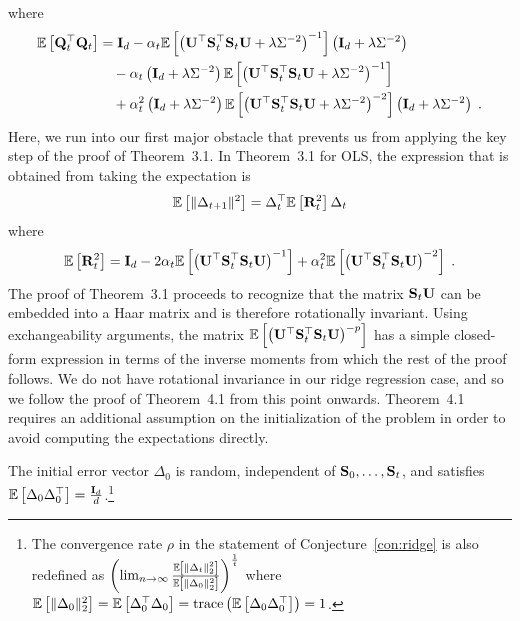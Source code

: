 where
\begin{align*}
\mathbb{E}\left[\mathbf{Q}_t^\top\mathbf{Q}_t\right] &= \mathbf{I}_d - \alpha_t\mathbb{E}\left[\left(\mathbf{U}^\top\mathbf{S}_t^\top\mathbf{S}_t\mathbf{U} + \lambda\Sigma^{-2}\right)^{-1}\right]\left(\mathbf{I}_d + \lambda\Sigma^{-2}\right) \\
&\quad - \alpha_t\left(\mathbf{I}_d + \lambda\Sigma^{-2}\right)\mathbb{E}\left[\left(\mathbf{U}^\top\mathbf{S}_t^\top\mathbf{S}_t\mathbf{U} + \lambda\Sigma^{-2}\right)^{-1}\right] \\
&\quad + \alpha_t^2\left(\mathbf{I}_d + \lambda\Sigma^{-2}\right)\mathbb{E}\left[\left(\mathbf{U}^\top\mathbf{S}_t^\top\mathbf{S}_t\mathbf{U} + \lambda\Sigma^{-2}\right)^{-2}\right]\left(\mathbf{I}_d + \lambda\Sigma^{-2}\right) \;.
\end{align*}
Here, we run into our first major obstacle that prevents us from applying the key step of the proof of Theorem~3.1. In Theorem~3.1 for OLS, the expression that is obtained from taking the expectation is
\[
\mathbb{E}\left[\|\Delta_{t+1}\|^2\right] = \Delta_t^\top\mathbb{E}\left[\mathbf{R}_t^2\right]\Delta_t
\]
where
\[
\mathbb{E}\left[\mathbf{R}_t^2\right] = \mathbf{I}_d - 2\alpha_t\mathbb{E}\left[\left(\mathbf{U}^\top\mathbf{S}_t^\top\mathbf{S}_t\mathbf{U}\right)^{-1}\right] + \alpha_t^2\mathbb{E}\left[\left(\mathbf{U}^\top\mathbf{S}_t^\top\mathbf{S}_t\mathbf{U}\right)^{-2}\right] \;.
\]
The proof of Theorem~3.1 proceeds to recognize that the matrix $\mathbf{S}_t\mathbf{U}$ can be embedded into a Haar matrix and is therefore rotationally invariant. Using exchangeability arguments, the matrix $\mathbb{E}\left[\left(\mathbf{U}^\top\mathbf{S}_t^\top\mathbf{S}_t\mathbf{U}\right)^{-p}\right]$ has a simple closed-form expression in terms of the inverse moments from which the rest of the proof follows. We do not have rotational invariance in our ridge regression case, and so we follow the proof of Theorem~4.1 from this point onwards. Theorem~4.1 requires an additional assumption on the initialization of the problem in order to avoid computing the expectations directly.

\begin{assumption} \label{asp:initialization}
The initial error vector $\Delta_0$ is random, independent of $\mathbf{S}_0,\ldots,\mathbf{S}_t$, and satisfies $\mathbb{E}\left[\Delta_0\Delta_0^\top\right]=\frac{\mathbf{I}_d}{d}$.\footnote{The convergence rate $\rho$ in the statement of Conjecture~\ref{con:ridge} is also redefined as $\left(\lim_{n\rightarrow\infty}\frac{\mathbb{E}\left[\|\Delta_t\|_2^2\right]}{\mathbb{E}\left[\|\Delta_0\|_2^2\right]}\right)^\frac{1}{t}$ where $\mathbb{E}\left[\|\Delta_0\|_2^2\right]=\mathbb{E}\left[\Delta_0^\top\Delta_0\right]=\mathrm{trace}\left(\mathbb{E}\left[\Delta_0\Delta_0^\top\right]\right)=1$.}
\end{assumption}

